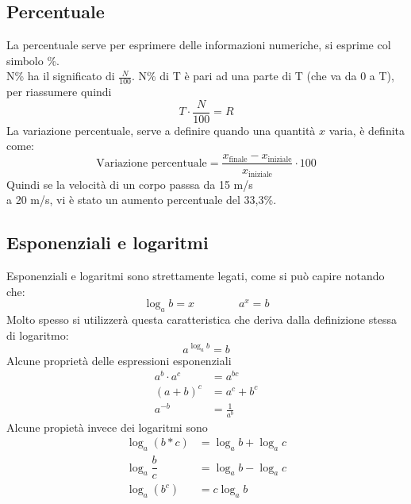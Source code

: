 

\subsection{Percentuale}

La percentuale serve per esprimere delle informazioni numeriche, si esprime col simbolo \%.\\ 
N\% ha il significato di $\frac{N}{100}$. N\% di T è pari ad una parte di T (che va da 0 a T), 
per riassumere quindi 
\begin{equation*}
  T\cdot\frac{N}{100}=R
\end{equation*}
La variazione percentuale, serve a definire quando una quantità $x$ varia, è definita come:
\begin{equation*}
  \text{Variazione percentuale}=
  \frac{x_{\text{finale}}-x_{\text{iniziale}}}{x_{\text{iniziale}}}\cdot100
\end{equation*}
Quindi se la velocità di un corpo passsa da 15 m/s\\ a 20 m/s, vi è stato un aumento percentuale del 33,3\%.\\

\subsection{Esponenziali e logaritmi}
Esponenziali e logaritmi sono strettamente legati, come si può capire notando che:
\begin{equation*}
  \log_{a} b=x\qquad \qquad
  a^{x}=b
\end{equation*}
Molto spesso si utilizzerà questa caratteristica che deriva dalla definizione stessa di logaritmo:
\begin{equation*}
  a^{\log_{a}b}=b
\end{equation*}
Alcune proprietà delle espressioni esponenziali
\begin{align*}
  a^{b}\cdot a^{c}&=a^{bc}\\
  (a+b)^{c}&=a^{c}+b^{c}\\
  a^{-b}&=\frac{1}{a^{b}}
\end{align*}
Alcune propietà invece dei logaritmi sono
\begin{align*}
  \log_{a}(b*c)&=\log_{a}b+\log_{a}c\\
  \log_{a}\dfrac{b}{c}&=\log_{a}b-\log_{a}c\\
  \log_{a}(b^{c})&=c\log_{a}b
\end{align*}

